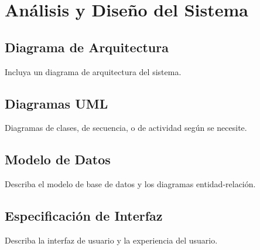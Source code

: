 	\chapter{Análisis y Diseño del Sistema}
	\section{Diagrama de Arquitectura}
	Incluya un diagrama de arquitectura del sistema.
	
	\section{Diagramas UML}
	Diagramas de clases, de secuencia, o de actividad según se necesite.
	
	\section{Modelo de Datos}
	Describa el modelo de base de datos y los diagramas entidad-relación.
	
	\section{Especificación de Interfaz}
	Describa la interfaz de usuario y la experiencia del usuario.
	
